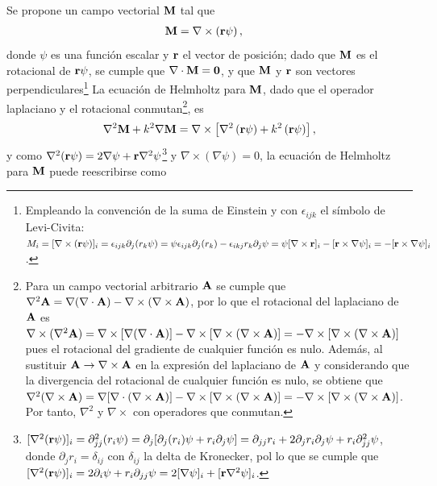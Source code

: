 Se propone un campo vectorial $\vb{M}$ tal que \cite{bohren1998absorption}
	\begin{align}
	\vb{M} &= \nabla \times \left(\vb{r} \psi\right),
	\label{eq:MrotCPsi}
	\end{align}
donde $\psi$ es una función escalar y $\vb{r}$ el vector de posición; dado que $\vb{M}$ es el rotacional de  $\vb{r}\psi$, se cumple que $\nabla\cdot \vb{M} = \vb{0}$, y que $\vb{M}$ y $\vb{r}$ son vectores perpendiculares\footnote{Empleando la convención de la suma de Einstein y con $\epsilon_{ijk}$ el símbolo de  Levi-Civita: $M_i = [\nabla\times(\vb{r}\psi)]_i =  \epsilon_{ijk}\partial_j(r_k\psi) =\psi\epsilon_{ijk}\partial_j(r_k) -\epsilon_{ikj}r_k\partial_j\psi  =\psi[\nabla\times\vb{r}]_i - [\vb{r}\times\nabla\psi]_i = - [\vb{r}\times\nabla\psi]_i$.} La  ecuación de Helmholtz para $\vb{M}$, dado que el operador laplaciano y el rotacional conmutan\footnote{ Para un campo vectorial arbitrario $\vb{A}$ se cumple que $\nabla^2\vb{A} = \nabla(\nabla\cdot\vb{A}) - \nabla\times(\nabla\times\vb{A})$, por lo que el rotacional del laplaciano de $\vb{A}$ es $ \nabla\times( \nabla^2\vb{A})=\nabla\times[\nabla(\nabla\cdot\vb{A})  ]-  \nabla\times[\nabla\times(\nabla\times \vb{A})] = -  \nabla\times[\nabla\times(\nabla\times \vb{A})] $ pues el rotacional del gradiente de cualquier función es nulo. Además, al sustituir $\vb{A}\to \nabla\times\vb{A}$ en la expresión del laplaciano de $\vb{A}$ y  considerando que la divergencia del rotacional de cualquier función es nulo, se obtiene que$ \nabla^2(\nabla\times\vb{A})=\nabla[\nabla\cdot(\nabla\times\vb{A})  ]-  \nabla\times[\nabla\times(\nabla\times \vb{A})] = -  \nabla\times[\nabla\times(\nabla\times \vb{A})] $. Por tanto, $\nabla^2$ y $\nabla\times$ con operadores que conmutan.}, es
	\begin{align*}
	\nabla^2 \vb{M} + k^2 \nabla\vb{M} = \nabla\times \left[ \nabla^2\left(\vb{r} \psi\right)  
											+ k^2  \left(\vb{r} \psi\right) \right],
	\end{align*}
y como $\nabla^2 (\vb{r}\psi)=2\nabla\psi+\vb{r}\nabla^2\psi$\footnote{$[\nabla^2 (\vb{r}\psi)]_i = \partial^2_{jj}(r_i\psi)= \partial_j [\partial_j(r_i)\psi+r_i\partial_j\psi] =\partial_{jj}{r_i} + 2 \partial_jr_i\partial_j\psi+r_i\partial^2_{jj}\psi$, donde $\partial_j r_i = \delta_{ij}$ con $\delta_{ij}$ la delta de Kronecker, pol lo que se cumple que $[\nabla^2 (\vb{r}\psi)]_i = 2\partial_i\psi+r_i\partial_{jj}\psi = 2[\nabla\psi]_i + [\vb{r}\nabla^2\psi]_i$.} y  $\nabla\times(\nabla \psi)=0$, la ecuación de Helmholtz para $\vb{M}$ puede reescribirse como
